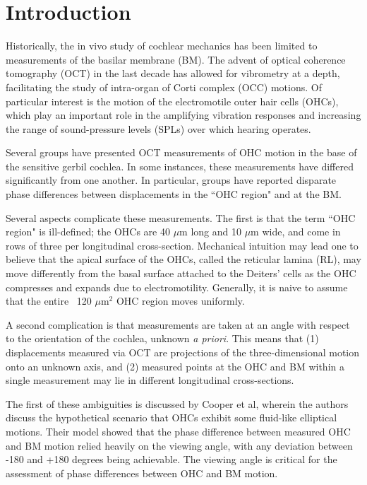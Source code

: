 \documentclass[aip,cp,amsmath,amssymb,reprint]{revtex4-2}
\begin{document}
\maketitle

\section{\label{sec:intro}Introduction}
\par{Historically, the in vivo study of cochlear mechanics has been limited to measurements of the basilar membrane (BM). The advent of optical coherence tomography (OCT) in the last decade has allowed for vibrometry at a depth, facilitating the study of intra-organ of Corti complex (OCC) motions. Of particular interest is the motion of the electromotile outer hair cells (OHCs), which play an important role in the amplifying vibration responses and increasing the range of sound-pressure levels (SPLs) over which hearing operates.}
\par{Several groups have presented OCT measurements of OHC motion in the base of the sensitive gerbil cochlea. In some instances, these measurements have differed significantly from one another. In particular, groups have reported disparate phase differences between displacements in the ``OHC region" and at the BM.}
\par{Several aspects complicate these measurements. The first is that the term ``OHC region" is ill-defined; the OHCs are 40 $\mu$m long and 10 $\mu$m wide, and come in rows of three per longitudinal cross-section. Mechanical intuition may lead one to believe that the apical surface of the OHCs, called the reticular lamina (RL), may move differently from the basal surface attached to the Deiters' cells as the OHC compresses and expands due to electromotility. Generally, it is naive to assume that the entire ~120 $\mu$m$^2$ OHC region moves uniformly.}
\par{A second complication is that measurements are taken at an angle with respect to the orientation of the cochlea, unknown \textit{a priori}. This means that (1) displacements measured via OCT are projections of the three-dimensional motion onto an unknown axis, and (2) measured points at the OHC and BM within a single measurement may lie in different longitudinal cross-sections.}
\par{The first of these ambiguities is discussed by Cooper et al, wherein the authors discuss the hypothetical scenario that OHCs exhibit some fluid-like elliptical motions\cite{cooper2018}. Their model showed that the phase difference between measured OHC and BM motion relied heavily on the viewing angle, with any deviation between -180 and +180 degrees being achievable. The viewing angle is critical for the assessment of phase differences between OHC and BM motion.}
\end{document}
